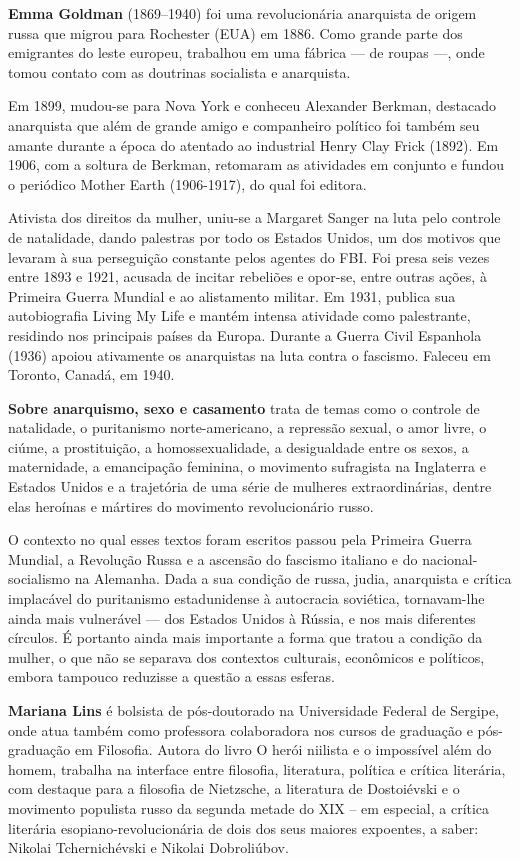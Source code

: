 \textbf{Emma Goldman} (1869–1940) foi uma revolucionária anarquista de origem russa que migrou para Rochester (EUA) em 1886. Como grande parte dos emigrantes do leste europeu, trabalhou em uma fábrica — de roupas —, onde tomou contato com as doutrinas socialista e anarquista.

Em 1899, mudou-se para Nova York e conheceu Alexander Berkman, destacado anarquista que além de grande amigo e companheiro político foi também seu amante durante a época do atentado ao industrial Henry Clay Frick (1892). Em 1906, com a soltura de Berkman, retomaram as atividades em conjunto e fundou o periódico Mother Earth (1906-1917), do qual foi editora.

Ativista dos direitos da mulher, uniu-se a Margaret Sanger na luta pelo controle de natalidade, dando palestras por todo os Estados Unidos, um dos motivos que levaram à sua perseguição constante pelos agentes do FBI. Foi presa seis vezes entre 1893 e 1921, acusada de incitar rebeliões e opor-se, entre outras ações, à Primeira Guerra Mundial e ao alistamento militar. Em 1931, publica sua autobiografia Living My Life e mantém intensa atividade como palestrante, residindo nos principais países da Europa. Durante a Guerra Civil Espanhola (1936) apoiou ativamente os anarquistas na luta contra o fascismo. Faleceu em Toronto, Canadá, em 1940.

\textbf{Sobre anarquismo, sexo e casamento} trata de temas como o controle de natalidade, o puritanismo norte-americano, a repressão sexual, o amor livre, o ciúme, a prostituição, a homossexualidade, a desigualdade entre os sexos, a maternidade, a emancipação feminina, o movimento sufragista na Inglaterra e Estados Unidos e a trajetória de uma série de mulheres extraordinárias, dentre elas heroínas e mártires do movimento revolucionário russo.

O contexto no qual esses textos foram escritos passou pela Primeira Guerra Mundial, a Revolução Russa e a ascensão do fascismo italiano e do nacional-socialismo na Alemanha. Dada a sua condição de russa, judia, anarquista e crítica implacável do puritanismo estadunidense à autocracia soviética, tornavam-lhe ainda mais vulnerável --- dos Estados Unidos à Rússia, e nos mais diferentes círculos. É portanto ainda mais importante a forma que tratou a condição da mulher, o que não se separava dos contextos culturais, econômicos e políticos, embora tampouco reduzisse a questão a essas esferas.

\textbf{Mariana Lins} é bolsista de pós-doutorado na Universidade Federal de Sergipe, onde atua também como professora colaboradora nos cursos de graduação e pós-graduação em Filosofia. Autora do livro O herói niilista e o impossível além do homem, trabalha na interface entre filosofia, literatura, política e crítica literária, com destaque para a filosofia de Nietzsche, a literatura de Dostoiévski e o movimento populista russo da segunda metade do XIX – em especial, a crítica literária esopiano-revolucionária de dois dos seus maiores expoentes, a saber: Nikolai Tchernichévski e Nikolai Dobroliúbov.




